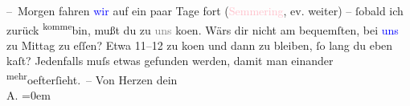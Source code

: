            \pstart
           – Morgen fahren \textcolor{blue}{wir}{} auf ein paar
               Tage fort (\textcolor{pink}{Semmering}{}\ledrightnote{\textcolor{pink}{Semmering}}, {\pb}ev. weiter) – ſobald
               ich zurück \substVorne{}\textsuperscript{komme}\substDazwischen{}bin\substHinten{}, mußt du zu \textcolor{gray}{uns} ko{\geminationm}en. Wärs
               dir nicht am bequemſten, bei \textcolor{blue}{uns}{}
               zu Mittag zu eſſen? Etwa 11–12 zu ko{\geminationm}en und dann zu
               bleiben, ſo lang du eben ka{\geminationn}ſt? Jedenfalls muſs etwas
               gefunden werden, damit man einander \substVorne{}\textsuperscript{mehr}\substDazwischen{}oefter\substHinten{}{ }ſieht. –\pend
           \pstart
           Von Herzen dein{\\[\baselineskip]}\spacefill\mbox{A.}\pend
           \leftskip=0em{}\endnumbering{}  
      